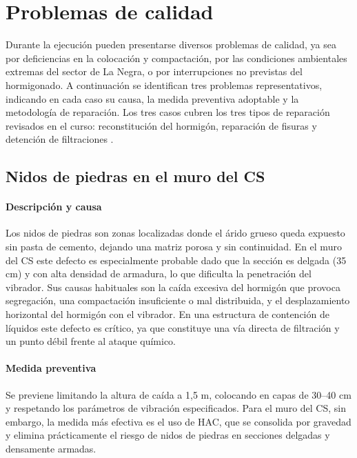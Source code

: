 \section{Problemas de calidad}

Durante la ejecución pueden presentarse diversos problemas de calidad, ya sea por deficiencias en la colocación y compactación, por las condiciones ambientales extremas del sector de La Negra, o por interrupciones no previstas del hormigonado. A continuación se identifican tres problemas representativos, indicando en cada caso su causa, la medida preventiva adoptable y la metodología de reparación. Los tres casos cubren los tres tipos de reparación revisados en el curso: reconstitución del hormigón, reparación de fisuras y detención de filtraciones \cite{ACI546}.

\subsection{Nidos de piedras en el muro del CS}

\paragraph{Descripción y causa}
Los nidos de piedras son zonas localizadas donde el árido grueso queda expuesto sin pasta de cemento, dejando una matriz porosa y sin continuidad. En el muro del CS este defecto es especialmente probable dado que la sección es delgada (35 cm) y con alta densidad de armadura, lo que dificulta la penetración del vibrador. Sus causas habituales son la caída excesiva del hormigón que provoca segregación, una compactación insuficiente o mal distribuida, y el desplazamiento horizontal del hormigón con el vibrador. En una estructura de contención de líquidos este defecto es crítico, ya que constituye una vía directa de filtración y un punto débil frente al ataque químico.

\paragraph{Medida preventiva}
Se previene limitando la altura de caída a 1{,}5 m, colocando en capas de 30--40 cm y respetando los parámetros de vibración especificados. Para el muro del CS, sin embargo, la medida más efectiva es el uso de HAC, que se consolida por gravedad y elimina prácticamente el riesgo de nidos de piedras en secciones delgadas y densamente armadas.

